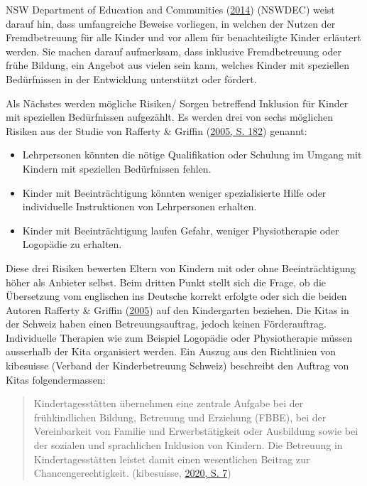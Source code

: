\documentclass[
  ngerman,
  11pt,
  paper=a4,
  twoside,
  titlepage=true,
  openright,
  abstract=on,
  toc=listofnumbered,
  numbers=noenddot,
  chapterprefix=true,
  headings=optiontohead,
  svgnames,
  dvipsnames]{scrreprt}
\providecommand{\tightlist}{%
  \setlength{\itemsep}{0pt}\setlength{\parskip}{0pt}}
\begin{document}
NSW Department of Education and Communities
(\protect\hyperlink{ref-centreforeducation2014}{2014}) (NSWDEC) weist
darauf hin, dass umfangreiche Beweise vorliegen, in welchen der Nutzen
der Fremdbetreuung für alle Kinder und vor allem für benachteiligte
Kinder erläutert werden. Sie machen darauf aufmerksam, dass inklusive
Fremdbetreuung oder frühe Bildung, ein Angebot aus vielen sein kann,
welches Kinder mit speziellen Bedürfnissen in der Entwicklung
unterstützt oder fördert.

Als Nächstes werden mögliche Risiken/ Sorgen betreffend Inklusion für
Kinder mit speziellen Bedürfnissen aufgezählt. Es werden drei von sechs
möglichen Risiken aus der Studie von Rafferty \& Griffin
(\protect\hyperlink{ref-raffertyux5cux26Griffin2005}{2005, S. 182})
genannt:

\begin{itemize}
\tightlist
\item
  Lehrpersonen könnten die nötige Qualifikation oder Schulung im Umgang
  mit Kindern mit speziellen Bedürfnissen fehlen.
\item
  Kinder mit Beeinträchtigung könnten weniger spezialisierte Hilfe oder
  individuelle Instruktionen von Lehrpersonen erhalten.
\item
  Kinder mit Beeinträchtigung laufen Gefahr, weniger Physiotherapie oder
  Logopädie zu erhalten.
\end{itemize}

Diese drei Risiken bewerten Eltern von Kindern mit oder ohne
Beeinträchtigung höher als Anbieter selbst. Beim dritten Punkt stellt
sich die Frage, ob die Übersetzung vom englischen ins Deutsche korrekt
erfolgte oder sich die beiden Autoren Rafferty \& Griffin
(\protect\hyperlink{ref-raffertyux5cux26Griffin2005}{2005}) auf den
Kindergarten beziehen. Die Kitas in der Schweiz haben einen
Betreuungsauftrag, jedoch keinen Förderauftrag. Individuelle Therapien
wie zum Beispiel Logopädie oder Physiotherapie müssen ausserhalb der
Kita organisiert werden. Ein Auszug aus den Richtlinien von kibesuisse
(Verband der Kinderbetreuung Schweiz) beschreibt den Auftrag von Kitas
folgendermassen:

\begin{quote}
Kindertagesstätten übernehmen eine zentrale Aufgabe bei der
frühkindlichen Bildung, Betreuung und Erziehung (FBBE), bei der
Vereinbarkeit von Familie und Erwerbstätigkeit oder Ausbildung sowie bei
der sozialen und sprachlichen Inklusion von Kindern. Die Betreuung in
Kindertagesstätten leistet damit einen wesentlichen Beitrag zur
Chancengerechtigkeit. (kibesuisse,
\protect\hyperlink{ref-richtlinienKindertagessstuxe4tten_2020}{2020, S.
7})
\end{quote}
\end{document}
